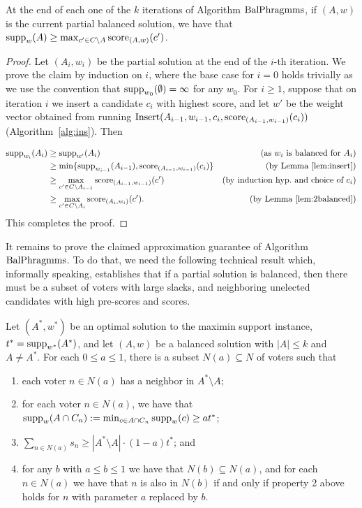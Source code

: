 \begin{lemma}\label{lem:315localoptimality}
At the end of each one of the $k$ iterations of Algorithm $\operatorname{BalPhragmms}$, if $(A,w)$ is the current partial balanced solution, we have that $\operatorname{supp}_{w}(A)\geq \max_{c'\in C\setminus A} \operatorname{score}_{(A,w)}(c')$.
\end{lemma}
\begin{proof}
Let $(A_i,w_i)$ be the partial solution at the end of the $i$-th iteration. We prove the claim by induction on $i$, where the base case for $i=0$ holds trivially as we use the convention that $\operatorname{supp}_{w_0}(\emptyset)=\infty$ for any $w_0$. For $i\geq 1$, suppose that on iteration $i$ we insert a candidate $c_i$ with highest score, and let $w'$ be the weight vector obtained from running $\operatorname{Insert}(A_{i-1}, w_{i-1}, c_i, \operatorname{score}_{(A_{i-1}, w_{i-1})}(c_i))$ (Algorithm~\ref{alg:ins}). Then

\begin{align*}
\operatorname{supp}_{w_i}(A_i) &\geq \operatorname{supp}_{w'}(A_i) &\text{(as $w_i$ is balanced for $A_i$)}\\
&\geq \min\{ \operatorname{supp}_{w_{i-1}}(A_{i-1}), \operatorname{score}_{(A_{i-1}, w_{i-1})}(c_i) \} &\text{(by Lemma~\ref{lem:insert})}\\
&\geq \max_{c'\in C\setminus A_{i-1}} \operatorname{score}_{(A_{i-1}, w_{i-1})}(c') &\text{(by induction hyp.~and choice of $c_i$)}\\
&\geq \max_{c'\in C\setminus A_{i}} \operatorname{score}_{(A_{i}, w_{i})}(c'). &\text{(by Lemma~\ref{lem:2balanced})}
\end{align*}
This completes the proof.
\end{proof}


It remains to prove the claimed approximation guarantee of Algorithm $\operatorname{BalPhragmms}$. 
To do that, we need the following technical result which, informally speaking, establishes that if a partial solution is balanced, then there must be a subset of voters with large slacks, and neighboring unelected candidates with high pre-scores and scores.   

\begin{lemma}\label{lem:N_a}
Let $(A^*, w^*)$ be an optimal solution to the maximin support instance, $t^*=\operatorname{supp}_{w^*}(A^*)$, and let $(A,w)$ be a balanced solution with $|A|\leq k$ and $A\neq A^*$. For each $0\leq a\leq 1$, there is a subset $N(a)\subseteq N$ of voters such that 
\begin{enumerate}
	\item each voter $n\in N(a)$ has a neighbor in $A^*\setminus A$;
	\item for each voter $n\in N(a)$, we have that $\operatorname{supp}_w(A\cap C_n):=\min_{c\in A\cap C_n} \operatorname{supp}_w(c)\geq at^*$;
	\item $\sum_{n\in N(a)} s_n \geq |A^* \setminus A|\cdot (1-a) t^*$; and
	\item for any $b$ with $a\leq b\leq 1$ we have that $N(b)\subseteq N(a)$, and for each $n\in N(a)$ we have that $n$ is also in $N(b)$ if and only if property 2 above holds for $n$ with parameter $a$ replaced by $b$.
\end{enumerate}
\end{lemma}


